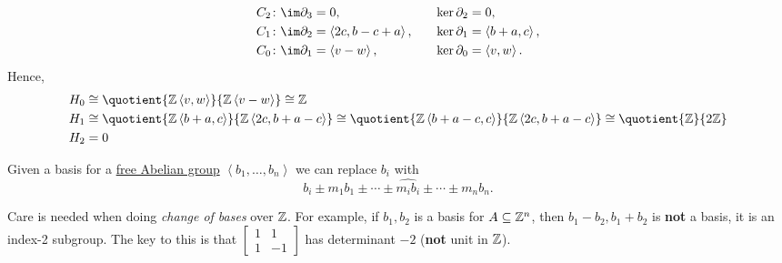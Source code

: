 \begin{explanation}
	\[
		\begin{alignedat}{3}
			C_2&\colon \im \partial _3 = 0, &\ker \partial _2 &= 0, \\
			C_1&\colon \im \partial _2 = \left< 2c, b - c + a \right> , \qquad&\ker \partial _1 &= \left< b +a, c \right>,\\
			C_0&\colon \im \partial _1 = \left< v - w\right> , &\ker \partial _0 &= \left< v, w\right>.
		\end{alignedat}
	\]
	Hence,
	\[
		\begin{split}
			H_0 &\cong \quotient{\mathbb{\MakeUppercase{z}} \left< v, w \right> }{\mathbb{\MakeUppercase{z}} \left< v - w \right> } \cong \mathbb{\MakeUppercase{z}}\\
			H_1 &\cong \quotient{\mathbb{\MakeUppercase{z}} \left< b + a, c \right> }{\mathbb{\MakeUppercase{z}} \left< 2c, b+a-c \right> } \cong \quotient{\mathbb{\MakeUppercase{z}} \left< b + a - c, c \right> }{\mathbb{\MakeUppercase{z}} \left< 2c, b+a-c \right> } \cong \quotient{\mathbb{\MakeUppercase{z}} }{2\mathbb{\MakeUppercase{z}}}\\
			H_2 &= 0\\
		\end{split}
	\]
\end{explanation}

\begin{remark}
	Given a basis for a \hyperref[def:free-Abelian-group]{free Abelian group} \(\left<  b_1, \ldots, b_n  \right>\) we can replace \(b_{i} \) with
	\[
		b_i \pm m_1b_1 \pm \cdots \pm \widehat{m_ib_i} \pm \cdots \pm m_n b_n.
	\]
\end{remark}

\begin{remark}
	Care is needed when doing \emph{change of bases} over \(\mathbb{\MakeUppercase{z}} \). For example,
	if \(b_1, b_2\) is a basis for \(A \subseteq \mathbb{\MakeUppercase{z}} ^n\), then \(b_1 - b_2, b_1 + b_2\) is \textbf{not} a basis, it is an index-2 subgroup.
	The key to this is that \(\begin{bmatrix} 1 & 1 \\ 1 & -1 \end{bmatrix}\) has determinant \(-2\) (\textbf{not} unit in \(\mathbb{\MakeUppercase{z}}\)).
\end{remark}

